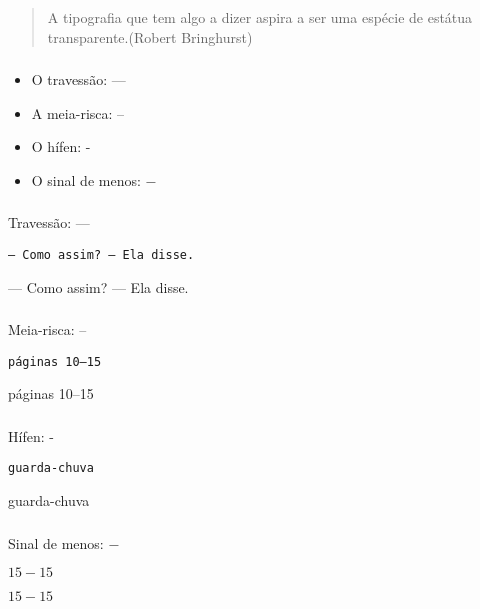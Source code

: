 \begin{frame}[standout]
  \Huge
\end{frame}

\begin{frame}
  \frametitle{}
  \Huge
  \begin{quote}
    A tipografia que tem algo a dizer aspira a ser uma espécie de estátua
    transparente.\hfill(Robert Bringhurst)
  \end{quote}
\end{frame}

\begin{frame}
  \frametitle{}
  \Huge
  \begin{itemize}
    \item O travessão: —
    \item A meia-risca: –
    \item O hífen: -
    \item O sinal de menos: \( - \)
  \end{itemize}
\end{frame}

\begin{frame}[fragile]
  \frametitle{}
  \LARGE
  Travessão: —

  \texttt{--- Como assim? --- Ela disse.}

  --- Como assim? --- Ela disse.
\end{frame}

\begin{frame}[fragile]
  \frametitle{}
  \LARGE
  Meia-risca: –

  \texttt{páginas 10--15}

  páginas 10--15
\end{frame}

\begin{frame}[fragile]
  \frametitle{}
  \LARGE
  Hífen: -

  \texttt{guarda-chuva}

  guarda-chuva
\end{frame}

\begin{frame}[fragile]
  \frametitle{}
  \LARGE
  Sinal de menos: \( - \)

  \texttt{\( 15 - 15 \)}

  \( 15 - 15 \)
\end{frame}

